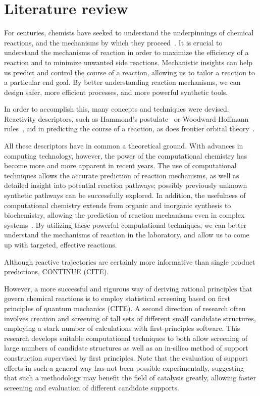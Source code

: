 \chapter{Literature review}%
\label{ch:lit-review}

For centuries,
chemists have seeked to understand the underpinnings of chemical reactions,
and the mechanisms by which they proceed~\cite{Armstrong_1887}.
It is crucial to understand the mechanisms of reaction in order to maximize the efficiency of a reaction
and to minimize unwanted side reactions.
Mechanistic insights can help us predict and control the course of a reaction,
allowing us to tailor a reaction to a particular end goal.
By better understanding reaction mechanisms,
we can design safer,
more efficient processes,
and more powerful synthetic tools.

In order to accomplish this,
many concepts and techniques were devised.
Reactivity descriptors,
such as
Hammond's postulate~\cite{Hammond_1955,Cremer_2012,HammondPrinciple} or
Woodward-Hoffmann rules~\cite{Havinga_1961,Woodward_1965,Dewar_1966,Zimmerman_1966,Woodward_1969,Nobel_1981},
aid in predicting the course of a reaction,
as does frontier orbital theory~\cite{Fukui_1952,Brown_2013}.

All these descriptors have in common a theoretical ground.
With advances in computing technology,
however,
the power of the computational chemistry has become more and more apparent in recent years.
The use of computational techniques allows the accurate prediction of reaction mechanisms,
as well as detailed insight into potential reaction pathways;
possibly previously unknown synthetic pathways can be successfully explored.
In addition,
the usefulness of computational chemistry extends from organic and inorganic synthesis to biochemistry,
allowing the prediction of reaction mechanisms even in complex systems~\cite{Klippenstein_2014}.
By utilizing these powerful computational techniques,
we can better understand the mechanisms of reaction in the laboratory,
and allow us to come up with targeted,
effective reactions.

Although reactive trajectories are certainly more informative than single product predictions,
CONTINUE (CITE).

However,
a more successful and rigurous way of deriving rational principles that govern
chemical reactions is to employ statistical screening based on first principles
of quantum mechanics (CITE).
A second direction of research often involves creation and screening of
tall sets of different small candidate structures,
employing a stark number of calculations with first-principles software.
This research develops suitable computational techniques
to both allow screening of large numbers of candidate structures as well as
an in-silico method of support construction supervised by first principles.
Note that the evaluation of support effects in such a general way
has not been possible experimentally,
suggesting that such a methodology may benefit the field of catalysis greatly,
allowing faster screening and evaluation of
different candidate supports.

